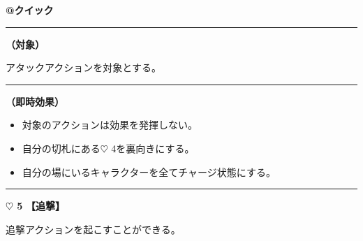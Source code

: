 \documentclass[twocolumn,a5paper,papersize,10pt]{jarticle}
\begin{document}
\begin{tcolorbox}[title={\small\bf【Action】休戦}{\scriptsize （速攻魔法）}]

{\scriptsize\bf @クイック }

\vspace{1mm} %
\hrule height 0.1mm depth 0mm width 62mm %
\vspace{1mm} %

{\bf（対象）}

アタックアクションを対象とする。

\vspace{1mm} %
\hrule height 0.1mm depth 0mm width 62mm %
\vspace{1mm} %

{\bf（即時効果）}


\vspace{-1zh}%
\begin{itemize}
\setlength{\leftskip}{-0.3cm}
\setlength{\parskip}{0pt} %

\item 対象のアクションは効果を発揮しない。

\item 自分の切札にある{\normalsize $\heartsuit$} 4を裏向きにする。 

\item 自分の場にいるキャラクターを全てチャージ状態にする。
\vspace{-1zh}%
\end{itemize}

\vspace{1mm} %
\end{tcolorbox}

\vspace{-1zh}

 
 
 
 
 

\vspace{3mm} %
\hrule height 0.5mm depth 0mm width 66.5mm %
\vspace{1mm} %
{\Large\bf $\heartsuit$ 5} {\normalsize\bf【追撃】} %
\vspace{1mm} %

追撃アクションを起こすことができる。
\end{document}
